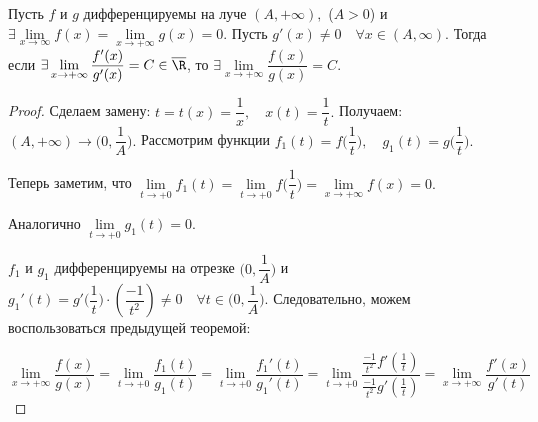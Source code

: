 \begin{theorem}
	\hypertarget{thrm5.20}{} Пусть $f$ и $g$ дифференцируемы на луче $(A, +\infty),$ ($A > 0$) и $\exists \lim\limits_{x\to \infty} f(x) = \lim\limits_{x \to +\infty} g(x) = 0.$ Пусть $g'(x) \neq 0 \quad \forall x \in (A, \infty).$ Тогда если $\exists \lim\limits_{x\to+\infty} \dfrac{f'(x)}{g'(x)}= C \in \overline{\R}$, то $\exists \lim\limits_{x\to +\infty} \dfrac{f(x)}{g(x)} = C.$
\end{theorem}
\begin{proof}
	Сделаем замену: $t = t(x) = \dfrac{1}{x}, \quad x(t) = \dfrac{1}{t}.$ Получаем: $(A, +\infty) \rightarrow \Big(0, \dfrac{1}{A}\Big).$ Рассмотрим функции $f_{1}(t) = f\Big(\dfrac{1}{t}\Big), \quad g_{1}(t) = g\Big(\dfrac{1}{t}\Big).$
	
	Теперь заметим, что $\lim\limits_{t\to+0} f_{1}(t)= \lim\limits_{t\to+0} f\Big(\dfrac{1}{t}\Big) = \lim\limits_{x\to+\infty} f(x) = 0.$
	
	Аналогично $\lim\limits_{t\to+0} g_{1}(t) = 0.$
	
	$f_{1}$ и $g_{1}$ дифференцируемы на отрезке $\Big(0, \dfrac{1}{A}\Big)$ и $g_{1}'(t) = g'\Big(\dfrac{1}{t}\Big) \cdot \left(\dfrac{-1}{t^{2}}\right) \neq 0 \quad \forall t \in \Big(0, \dfrac{1}{A}\Big)$. Следовательно, можем воспользоваться предыдущей теоремой:
	
	$$\lim\limits_{x\to+\infty} \dfrac{f(x)}{g(x)}=\lim\limits_{t\to+0} \dfrac{f_{1}(t)}{g_{1}(t)}= \lim\limits_{t\to+0} \dfrac{f_{1}'(t)}{g_{1}'(t)} = \lim\limits_{t\to +0}\dfrac{\frac{-1}{t^{2}}f'\left(\frac{1}{t}\right) }{\frac{-1}{t^{2}}g'\left(\frac{1}{t}\right) } = \lim\limits_{x\to +\infty} \dfrac{f'(x)}{g'(t)}$$
	
\end{proof}

